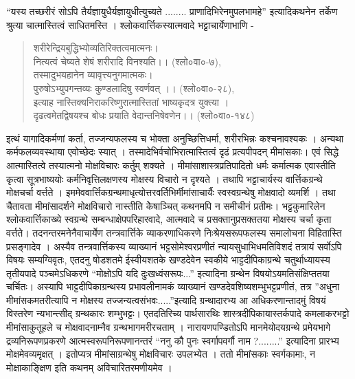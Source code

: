“यस्य तच्छरीरं सोऽपि तैर्यज्ञायुधैर्यज्ञायुधीत्युच्यते ........ प्राणादिभिरेनमुपलभामहे” इत्यादिकथनेन तर्केण श्रुत्या चात्मास्तित्वं साधितमस्ति । श्लोकवार्त्तिकस्यात्मवादे भट्टाचार्येणाभाणि - 
\begin{verse}
शरीरेन्द्रियबुद्धिभ्योव्यतिरिक्तत्वमात्मनः। \\
नित्यत्वं चेष्यते शेषं शरीरादि विनश्यति।। (श्लो०वा०-७),\\
तस्मादुभयहानेन व्यावृत्त्यनुगमात्मकः। \\
पुरुषोऽभ्युपगन्तव्यः कुण्डलादिषु स्वर्णवत् ।। (श्लो०वा०-२८), \\
इत्याह नास्तिक्यनिराकरिष्णुरात्मास्तितां भाष्यकृदत्र युक्त्या ।\\ 
दृढत्वमेतद्विषयश्च बोधः प्रयाति वेदान्तनिषेवणेन।। (श्लो०वा०-१४८) 
\end{verse}
इत्थं यागादिकर्मणां कर्ता, तज्जन्यफलस्य च भोक्ता अनुच्छित्तिधर्मा, शरीरभिन्नः कश्चनावश्यकः । अन्यथा कर्मफलव्यवस्थाया एवोच्छेदः स्यात् । तस्मादेभिर्वचोभिरात्मास्तित्वं दृढं प्रत्यपीपदन् मीमांसकाः। एवं सिद्धे आत्मास्तित्वे तस्यात्मनो मोक्षविचारः कर्तुम् शक्यते । मीमांसाशास्त्रप्रतिपादितो धर्मः कर्मात्मक एवास्तीति कृत्वा सूत्रभाष्ययोः कर्मनिवृत्तिलक्षणस्य मोक्षस्य विचारो न दृश्यते । तथापि भट्टाचार्यस्य वार्त्तिकग्रन्थे मोक्षचर्चा वर्त्तते । इममेववार्त्तिकग्रन्थमाधृत्योत्तरवर्तिभिर्मीमांसाचार्यैः स्वस्वग्रन्थेषु मोक्षवादो व्यमर्शि । तथा चैतावता मीमांसादर्शने मोक्षविचारो नास्तीति केेषाञ्चित् कथनमपि न समीचीनं प्रतीमः। भट्टकुमारिलेन श्लोकवार्त्तिकाख्ये स्वग्रन्थे सम्बन्धाक्षेपपरिहारवादे, आत्मवादे च प्रसक्तानुप्रसक्ततया मोक्षस्य चर्चा कृता वर्त्तते। 	तदनन्तरमनेनैवाचार्येण तन्त्रवार्त्तिके व्याकरणाधिकरणे निःश्रेयसरूपफलस्य समालोचना विहितास्ति प्रसङ्गादेव । अस्यैव तन्त्रवार्त्तिकस्य व्याख्यानं भट्टसोमेश्वरप्रणीतं न्यायसुधाभिधमतिविशदं तत्रायं सर्वोऽपि विषयः सम्यग्विवृतः, एतदनु षोडशतमे ईस्वीयशतके खण्डदेवेन स्वकीये भाट्टदीपिकाग्रन्थे चतुर्थाध्यायस्य तृतीयपादे पञ्चमेऽधिकरणे “मोक्षोऽपि यदि दुःखध्वंसरूपः...” इत्यादिना ग्रन्थेन विषयोऽयमतिसंक्षिप्ततया चर्चितः। अस्यापि भाट्टदीपिकाग्रन्थस्य प्रभावलीनामकं व्याख्यानं खण्डदेवशिष्यशम्भुभट्टप्रणीतं, तत्र ”अधुना मीमांसकमतरीत्यापि न मोक्षस्य तज्जन्यत्वसंभवः.....”इत्यादि ग्रन्थादारभ्य आ अधिकरणान्तादमुं विषयं विस्तरेण न्यभान्त्सीद् ग्रन्थकारः शम्भुभट्टः। एतदतिरिच्य पार्थसारथिः शास्त्रदीपिकायास्तर्कपादे कमलाकरभट्टो  मीमांसाकुतूहले च मोक्षवादनाम्नैव ग्रन्थभागमरीरचताम् । नारायणपण्डितोऽपि मानमेयोदयग्रन्थे प्रमेयभागे द्रव्यनिरूपणप्रकरणे आत्मस्वरूपनिरूपणानन्तरं “ननु कौ पुनः स्वर्गापवर्गौ नाम ?........” इत्यादिना प्रारभ्य मोक्षमेवव्यमृक्षत् । इतोप्यत्र मीमांसाग्रन्थेषु मोक्षविचारः उपलभ्येत । ततो मीमांसकाः स्वर्गकामाः, न मोक्षाकाङ्क्षिण इति कथनम् अविचारितरमणीयमेव ।

